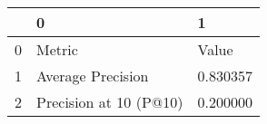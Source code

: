 \begin{tabular}{lll}
\toprule
 & 0 & 1 \\
\midrule
0 & Metric & Value \\
1 & Average Precision & 0.830357 \\
2 & Precision at 10 (P@10) & 0.200000 \\
\bottomrule
\end{tabular}
